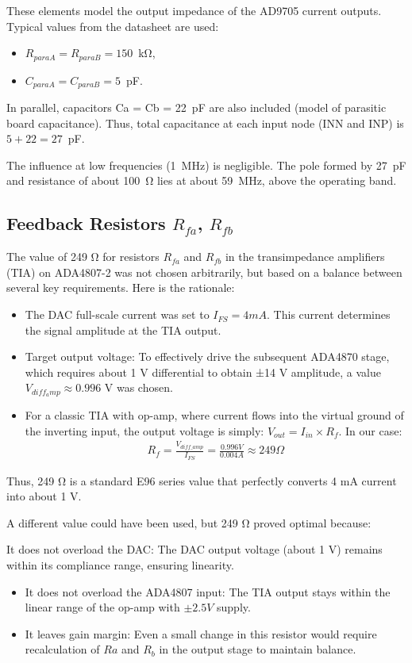 \documentclass[a4paper, 12pt]{article}
\begin{document}
These elements model the output impedance of the AD9705 current outputs.
Typical values from the datasheet \cite{AD9705_ds} are used:
\begin{itemize}
    \item \(R_{paraA} = R_{paraB} = 150\)~kΩ,
    \item \(C_{paraA} = C_{paraB} = 5\)~pF.
\end{itemize}
In parallel, capacitors Ca = Cb = 22~pF are also included (model of parasitic
board capacitance). Thus, total capacitance at each input node (INN and INP)
is \(5+22 = 27\)~pF.

The influence at low frequencies (1~MHz) is negligible. The pole formed
by 27~pF and resistance of about 100~Ω lies at about 59~MHz, above the
operating band.

\subsection{Feedback Resistors \texorpdfstring{\(R_{fa}\), \(R_{fb}\)}{Rfa, Rfb}}
\par The value of 249 Ω for resistors \(R_{fa}\) and \(R_{fb}\) in the transimpedance amplifiers (TIA) on ADA4807-2 was not chosen arbitrarily, but based on a balance between several key requirements. Here is the rationale:

\begin{itemize}
    \item The DAC full-scale current was set to \(I_{FS} = 4 mA\). This current determines the signal amplitude at the TIA output.
    \item Target output voltage: To effectively drive the subsequent ADA4870 stage, which requires about 1 V differential to obtain ±14 V amplitude, a value \(V_{diff_amp} \approx 0.996\) V was chosen.
    \item For a classic TIA with op-amp, where current flows into the virtual ground of the inverting input, the output voltage is simply: \(V_{out} = I_{in} \times R_f\). In our case:
\begin{align}
    R_f = \frac{V_{diff\_amp}}{I_{FS}} = \frac{0.996V}{0.004A} \approx 249 \Omega
\end{align}    
\end{itemize}

\par Thus, 249 Ω is a standard E96 series value that perfectly converts 4 mA current into about 1 V.
\par A different value could have been used, but 249 Ω proved optimal because:
\par It does not overload the DAC: The DAC output voltage (about 1 V) remains within its compliance range, ensuring linearity.
\begin{itemize}
    \item It does not overload the ADA4807 input: The TIA output stays within the linear range of the op-amp with \(\pm 2.5V\) supply.
    \item It leaves gain margin: Even a small change in this resistor would require recalculation of \(Ra\) and \(R_b\) in the output stage to maintain balance.
\end{itemize}
\end{document}
